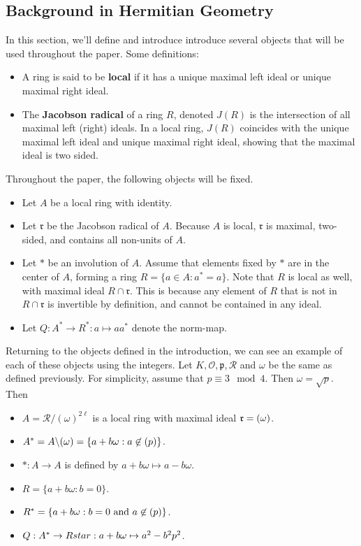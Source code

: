 \begin{center}
\section{Background in Hermitian Geometry}
\end{center}
In this section, we'll define and introduce introduce several objects that will be used throughout the paper.
Some definitions:
\begin{itemize}
\item A ring is said to be \textbf{local} if it has a unique maximal left ideal or unique maximal right ideal.
\item The \textbf{Jacobson radical} of a ring $R$, denoted $J(R)$ is the intersection of all maximal left (right) ideals. In a local ring, $J(R)$ coincides with the unique maximal left ideal and unique maximal right ideal, showing that the maximal ideal is two sided.
\end{itemize}

Throughout the paper, the following objects will be fixed.
\begin{itemize}
\item Let $A$ be a local ring with identity.
\item Let $\mathfrak{r}$ be the Jacobson radical of $A$. Because $A$ is local, $\mathfrak{r}$ is maximal, two-sided, and contains all non-units of $A$.
\item Let $*$ be an involution of $A$. Assume that elements fixed by $*$ are in the center of $A$, forming a ring $R = \{a \in A: a^* = a\}$.
Note that $R$ is local as well, with maximal ideal $R \cap \mathfrak{r}$. This is because any element of $R$ that is not in $R \cap \mathfrak{r}$ is invertible by definition, and cannot be contained in any ideal.
\item Let $Q: A^* \to R^*: a \mapsto aa^*$ denote the norm-map.
\end{itemize}

\begin{example}\label{ex2.1}
Returning to the objects defined in the introduction, we can see an example of each of these objects using the \padic integers.
Let $K, \mathcal{O}, \mathfrak{p}, \mathcal{R}$ and $\omega$ be the same as defined previously.
For simplicity, assume that $p \equiv 3 \mod 4$.
Then $\omega = \sqrt{p}$.
Then
\begin{itemize}
\item $A = \mathcal{R}/(\omega)^{2\ell}$ is a local ring with maximal ideal $\mathfrak{r} = (\omega)$.
\item $A^* = A \backslash (\omega) = \{a + b \omega : a \not\in (p) \}$.
\item $*: A \to A$ is defined by $a + b\omega \mapsto a - b\omega$.
\item $R = \{a + b\omega : b = 0\}$.
\item $R^* = \{a + b\omega: b = 0 \text{ and } a \not\in (p)\}$.
\item $Q: A^* \to Rstar: a + b\omega \mapsto a^2 - b^2 p^2$.
\end{itemize}
\end{example}

